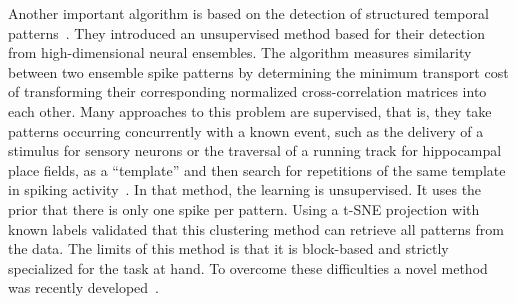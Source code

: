 \documentclass[brainsci, %
               review,submit,pdftex,moreauthors%
               ]{Definitions/mdpi}
\begin{document}
Another important algorithm is based on the detection of structured temporal patterns~\citep{grossberger_unsupervised_2018}. They introduced an unsupervised method based for their detection from high-dimensional neural ensembles. The algorithm measures similarity between two ensemble spike patterns by determining the minimum transport cost of transforming their corresponding normalized cross-correlation matrices into each other. Many approaches to this problem are supervised, that is, they take patterns occurring concurrently with a known event, such as the delivery of a stimulus for sensory neurons or the traversal of a running track for hippocampal place fields, as a ``template'' and then search for repetitions of the same template in spiking activity~\citep{nadasdy_replay_1999,lee_combinatorial_2004}.
In that method, the learning is unsupervised. It uses the prior that there is only one spike per pattern. 
Using a t-SNE projection with known labels validated that this clustering method can retrieve all patterns from the data.
The limits of this method is that it is block-based and strictly specialized for the task at hand. To overcome these difficulties a novel method was recently developed~\citep{sotomayor-gomez_spikeship_2021}.
\end{document}
